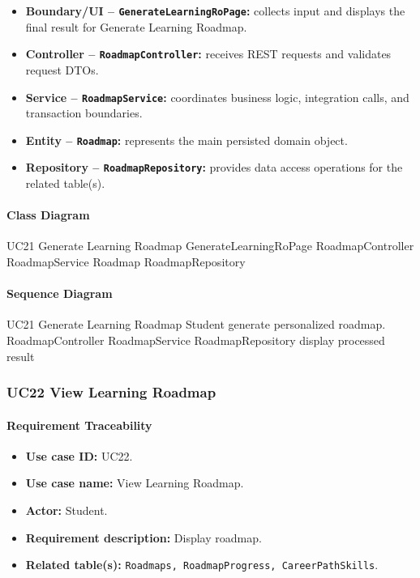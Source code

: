 \begin{itemize}
    \item \textbf{Boundary/UI -- \texttt{GenerateLearningRoPage}:} collects input and displays the final result for Generate Learning Roadmap.
    \item \textbf{Controller -- \texttt{RoadmapController}:} receives REST requests and validates request DTOs.
    \item \textbf{Service -- \texttt{RoadmapService}:} coordinates business logic, integration calls, and transaction boundaries.
    \item \textbf{Entity -- \texttt{Roadmap}:} represents the main persisted domain object.
    \item \textbf{Repository -- \texttt{RoadmapRepository}:} provides data access operations for the related table(s).
\end{itemize}

\paragraph{Class Diagram}

\ClassDiagram
{UC21 Generate Learning Roadmap}
{GenerateLearningRoPage}
{RoadmapController}
{RoadmapService}
{Roadmap}
{RoadmapRepository}

\paragraph{Sequence Diagram}

\SequenceDiagram
{UC21 Generate Learning Roadmap}
{Student}
{generate personalized roadmap.}
{RoadmapController}
{RoadmapService}
{RoadmapRepository}
{display processed result}

\subsubsection{UC22 View Learning Roadmap}

\paragraph{Requirement Traceability}

\begin{itemize}
    \item \textbf{Use case ID:} UC22.
    \item \textbf{Use case name:} View Learning Roadmap.
    \item \textbf{Actor:} Student.
    \item \textbf{Requirement description:} Display roadmap.
    \item \textbf{Related table(s):} \texttt{Roadmaps, RoadmapProgress, CareerPathSkills}.
\end{itemize}

